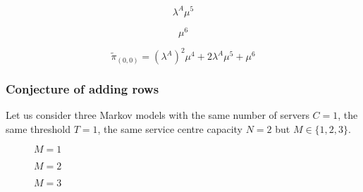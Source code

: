 \begin{multicols}{4}
    \begin{figure}[H]
        \centering
        \scalebox{0.6}{
            }
    \end{figure}
    \vspace*{\fill}
    \columnbreak
    \vspace*{0.3cm}
    \begin{equation*}
        \lambda^A \mu^5
    \end{equation*}
    \vspace*{\fill}
    \columnbreak
    \begin{figure}[H]
        \centering
        \scalebox{0.6}{
            }
    \end{figure}
    \vspace*{\fill}
    \columnbreak
    \vspace*{0.3cm}
    \begin{equation*}
        \mu^6
    \end{equation*}
\end{multicols}


\begin{equation*}
    \tilde{\pi}_{(0,0)} = (\lambda^A)^2 \mu^4 + 2 \lambda^A \mu^5 + \mu^6
\end{equation*}

\newpage
\subsubsection{Conjecture of adding rows}

Let us consider three Markov models with the same number of servers \(C=1\), 
the same threshold \(T=1\), the same service centre capacity \(N=2\) but 
\(M\in\{1, 2, 3\}\).


\begin{multicols}{3}
    \begin{figure}[H]
        \centering
        \scalebox{0.8}{
            }
        \caption{\(M=1\)}
    \end{figure}
    \columnbreak
    \begin{figure}[H]
        \centering
        \scalebox{0.8}{
            }
        \caption{\(M=2\)}
    \end{figure}
    \begin{figure}[H]
        \centering
        \scalebox{0.8}{
            }
        \caption{\(M=3\)}
    \end{figure}
\end{multicols}

